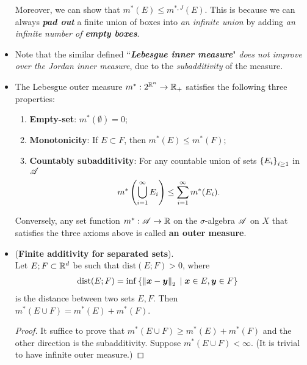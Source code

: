 \documentclass[11pt]{article}
\begin{document}
\begin{itemize}
\begin{remark}
Moreover, we can show that  $m^{*}(E) \le m^{*,J}(E)$. This is because  we can always \emph{\textbf{pad out}} a finite union of boxes into \emph{an infinite union} by adding \emph{an infinite number of \textbf{empty boxes}}. %
 \end{remark} 
 
 
\item  \begin{remark} 
Note that the similar defined ``\emph{\textbf{Lebesgue inner measure}}" \emph{does not improve over the Jordan inner measure}, due to the \emph{subadditivity} of the measure. 
\end{remark}  
 
 
\item \begin{proposition} 
 The Lebesgue outer measure $m^{*}: 2^{{\mathbb R}^{n}} \rightarrow {\mathbb R}_{+}$ satisfies the following three properties:
\begin{enumerate}
\item \textbf{Empty-set}: $m^{*}(\emptyset) = 0$;
\item \textbf{Monotonicity}: If $E\subset F$, then $m^{*}(E) \le m^{*}(F)$;
\item \textbf{Countably subadditivity}:  For any countable union of sets $\left\{E_{i}\right\}_{i\ge 1}$ in ${\mathscr A}$ 
\begin{align*}
 m^{*}\left(\bigcup_{i=1}^{\infty}E_{i}\right) \le  \sum_{i=1}^{\infty}m^{*}(E_{i}).
\end{align*}
\end{enumerate} 

Conversely, any set function $m^{*}: {\mathscr A} \rightarrow {\mathbb R}$ on the $\sigma$-algebra ${\mathscr A}$ on $X$ that satisfies the three axioms above is called \textbf{an outer measure}. \citep{rudin1987real, royden1988real, folland2013real}   
\end{proposition}

\item \begin{lemma} (\textbf{Finite additivity for separated sets}).\\
 Let $E; F \subset {\mathbb R}^{d}$ be such that $\text{dist}(E; F) > 0$, where
 \begin{align*}
 \text{dist}(E;F) &= \inf\left\{\left\|\boldsymbol{x} - \boldsymbol{y}\right\|_{2}\;|\; \boldsymbol{x}\in E, \boldsymbol{y}\in F \right\}
 \end{align*} is the distance between two sets $E,F$. 
Then $m^{*}(E\cup F) = m^{*}(E) + m^{*}(F)$. 
\end{lemma}
\begin{proof}
It suffice to prove that $m^{*}(E\cup F) \ge m^{*}(E) + m^{*}(F)$ and the other direction is the subadditivity. Suppose $m^{*}(E\cup F)< \infty$. (It is trivial to have infinite outer measure.) 


\end{proof}
\end{itemize}
\end{document}
